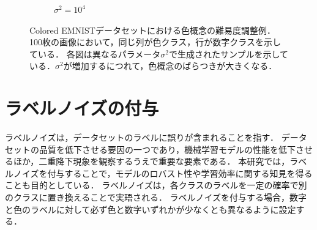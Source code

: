 \begin{figure}[H]
\begin{subfigure}[b]{0.48\textwidth}
        \caption{$\sigma^2 = 10^4$}
        \label{fig:coloredeminst_10000}
    \end{subfigure}
    \caption[Colored EMNISTデータセットにおける色概念の難易度調整例]{Colored EMNISTデータセットにおける色概念の難易度調整例．
    100枚の画像において，同じ列が色クラス，行が数字クラスを示している．
    各図は異なるパラメータ$\sigma^2$で生成されたサンプルを示している．$\sigma^2$が増加するにつれて，色概念のばらつきが大きくなる．
    }
    \label{fig:coloredeminsts}
\end{figure}

\section{ラベルノイズの付与}
ラベルノイズは，データセットのラベルに誤りが含まれることを指す．
データセットの品質を低下させる要因の一つであり，機械学習モデルの性能を低下させるほか，二重降下現象を観察するうえで重要な要素である．
本研究では，ラベルノイズを付与することで，モデルのロバスト性や学習効率に関する知見を得ることも目的としている．
ラベルノイズは，各クラスのラベルを一定の確率で別のクラスに置き換えることで実珸される．
ラベルノイズを付与する場合，数字と色のラベルに対して必ず色と数字いずれかが少なくとも異なるように設定する．
